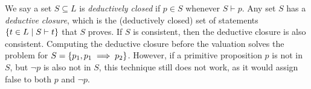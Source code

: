 We say a set \( S \subseteq L \) is \emph{deductively closed} if \( p \in S \) whenever \( S \vdash p \).
Any set \( S \) has a \emph{deductive closure}, which is the (deductively closed) set of statements \( \qty{t \in L \mid S \vdash t} \) that \( S \) proves.
If \( S \) is consistent, then the deductive closure is also consistent.
Computing the deductive closure before the valuation solves the problem for \( S = \qty{p_1, p_1 \implies p_2} \).
However, if a primitive proposition \( p \) is not in \( S \), but \( \neg p \) is also not in \( S \), this technique still does not work, as it would assign false to both \( p \) and \( \neg p \).
